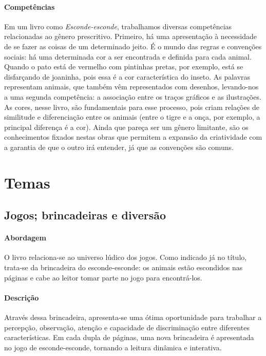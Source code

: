 \documentclass[11pt]{extarticle}
\begin{document}
\paragraph{Competências} Em um livro como
\emph{Esconde-esconde}, trabalhamos diversas competências relacionadas ao gênero prescritivo. Primeiro, há uma apresentação à necessidade de se fazer as coisas de um determinado jeito. É o mundo das regras e convenções sociais: há uma determinada cor a ser encontrada e definida para cada animal. Quando o pato está de vermelho com pintinhas pretas, por exemplo, está se disfarçando de joaninha, pois essa é a cor característica do inseto. As palavras representam animais, que também vêm representados com desenhos, levando-nos a uma segunda competência: a associação entre os traços gráficos e as ilustrações. As cores, nesse livro, são fundamentais para esse processo, pois criam relações de similitude e diferenciação entre os animais (entre o tigre e a onça, por exemplo, a principal diferença é a cor). Ainda que pareça ser um gênero limitante, são os conhecimentos fixados nestas obras que permitem a expansão da criatividade com a garantia de que o outro irá entender, já que as convenções são comuns.

\section{Temas}

\subsection{Jogos; brincadeiras e diversão}

\paragraph{Abordagem} O livro relaciona-se ao universo lúdico dos jogos. Como indicado já no título, trata-se da brincadeira do esconde-esconde: os animais estão escondidos nas páginas e cabe ao leitor tomar parte no jogo para encontrá-los.

\paragraph{Descrição} Através dessa brincadeira, apresenta-se uma ótima oportunidade para trabalhar a percepção, observação, atenção e capacidade de discriminação entre diferentes características. Em cada dupla de páginas, uma nova brincadeira é apresentada no jogo de esconde-esconde, tornando a leitura dinâmica e interativa.
\end{document}
